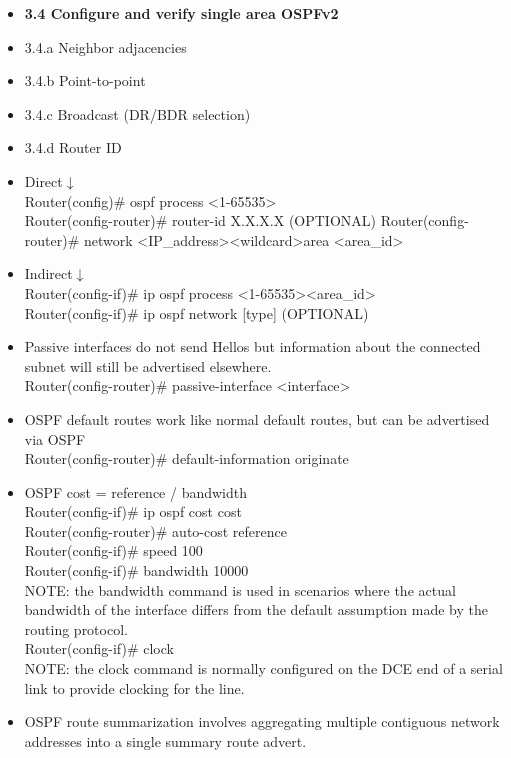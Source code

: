 \documentclass{article}
\begin{document}
\begin{itemize}
  \item \textbf{3.4 Configure and verify single area OSPFv2}
  \item 3.4.a Neighbor adjacencies
  \item 3.4.b Point-to-point
  \item 3.4.c Broadcast (DR/BDR selection)
  \item 3.4.d Router ID
  	\item[] Direct$\downarrow$\\
  		Router(config)\# ospf process \textless 1-65535\textgreater\\
  		Router(config-router)\# router-id X.X.X.X (OPTIONAL)
  		Router(config-router)\# network \textless IP\_address\textgreater \textless wildcard\textgreater area \textless area\_id\textgreater
  	\item[] Indirect$\downarrow$\\
  		Router(config-if)\# ip ospf process \textless 1-65535\textgreater \textless area\_id\textgreater\\
  		Router(config-if)\# ip ospf network [type] (OPTIONAL)
  	\item[] Passive interfaces do not send Hellos but information about the connected subnet will still be advertised elsewhere.\\
  		Router(config-router)\# passive-interface \textless interface\textgreater
  	\item[] OSPF default routes work like normal default routes, but can be advertised via OSPF\\
  		Router(config-router)\# default-information originate
  	\item[] OSPF cost = reference / bandwidth\\
  		Router(config-if)\# ip ospf cost cost\\
  		Router(config-router)\# auto-cost reference\\
  		Router(config-if)\# speed 100\\
  		Router(config-if)\# bandwidth 10000\\
  		NOTE: the bandwidth command is used in scenarios where the actual bandwidth of the interface differs from the default assumption made by the routing protocol.\\
  		Router(config-if)\# clock\\
  		NOTE: the clock command is normally configured on the DCE end of a serial link to provide clocking for the line.
  	\item[] OSPF route summarization involves aggregating multiple contiguous network addresses into a single summary route advert.\\

\end{itemize}
\end{document}
